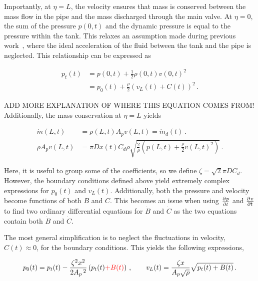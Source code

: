 Importantly, at $\eta = L$, the velocity ensures that mass is conserved between the mass flow in the pipe and the mass discharged through the main valve. At $\eta = 0$, the sum of the pressure $p(0,t)$ and the dynamic pressure is equal to the pressure within the tank. This relaxes an assumption made during previous work~\cite{Hos2015ModelPipe}, where the ideal acceleration of the fluid between the tank and the pipe is neglected. This relationship can be expressed as

\begin{equation*}
\begin{split}
    p_t(t) &= p(0,t) + \frac{1}{2} \rho(0,t) v(0,t)^2 \\
           &= p_0(t) + \frac{\rho}{2} \left( v_L(t) + C(t) \right)^2 \, .
\end{split}
\end{equation*}

ADD MORE EXPLANATION OF WHERE THIS EQUATION COMES FROM! Additionally, the mass conservation at $\eta=L$ yields

\begin{equation*}
\begin{split}
    \dot{m}(L,t) &= \rho(L,t) A_p v(L,t) = \dot{m}_d(t) \, . \\
    \rho A_p v(L,t) &= \pi D x(t) C_d \rho \sqrt{\frac{2}{\rho} \left( p(L,t) + \frac{\rho}{2} v(L,t)^2 \right)} \, .
\end{split}
\end{equation*}

Here, it is useful to group some of the coefficients, so we define $\zeta = \sqrt{2} \pi D C_d$. However, the boundary conditions defined above yield extremely complex expressions for $p_0(t)$ and $v_L(t)$. Additionally, both the pressure and velocity become functions of both $B$ and $C$. This becomes an issue when using $\pdiff{p}{t}$ and $\pdiff{v}{t}$ to find two ordinary differential equations for $\dot{B}$ and $\dot{C}$ as the two equations contain both $\dot{B}$ and $\dot{C}$. 

The most general simplification is to neglect the fluctuations in velocity, $C(t) \approx 0$, for the boundary conditions. This yields the following expressions,

\begin{equation*}
    p_0(t) = p_t(t) - \frac{\zeta^2 x^2}{2 A_p\,^2} \left( p_t(t) \textcolor{Red}{+ B(t)} \right)
    \, , \qquad
    v_L(t) = \frac{\zeta x}{A_p \sqrt{\rho}} \sqrt{p_t(t) + B(t)} \, .
\end{equation*}

